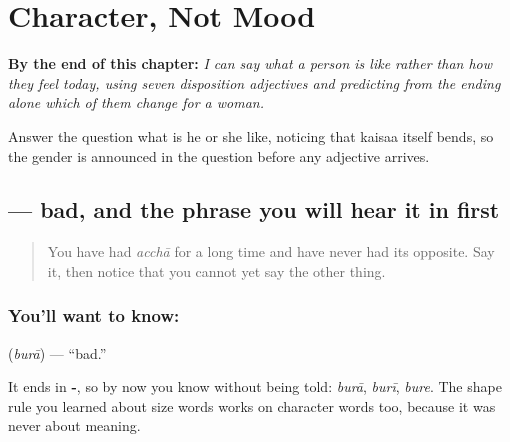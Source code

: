 
\chapter{Character, Not Mood}
\label{ch:hi-character}

\begin{chapteropening}
\textbf{By the end of this chapter:} \emph{I can say what a person is like rather than how they feel today, using seven disposition adjectives and predicting from the ending alone which of them change for a woman.}

Answer the question what is he or she like, noticing that kaisaa itself bends, so the gender is announced in the question before any adjective arrives.
\end{chapteropening}

\section[\texorpdfstring{\hi{बुरा} (burā)}{बुरा (burā)}]{ — bad, and the phrase you will hear it in first}

\label{lesson:HI-C83-buraa}



\begin{quote}
You have had \emph{acchā} for a long time and have never had its opposite. Say it, then notice that you cannot yet say the other thing.
\end{quote}

\subsection*{You'll want to know: }
\textbf{} (\emph{burā}) — \textquotedblleft{}bad.\textquotedblright{}

It ends in \textbf{-}, so by now you know without being told: \emph{burā}, \emph{burī}, \emph{bure}. The shape rule you learned about size words works on character words too, because it was never about meaning.

